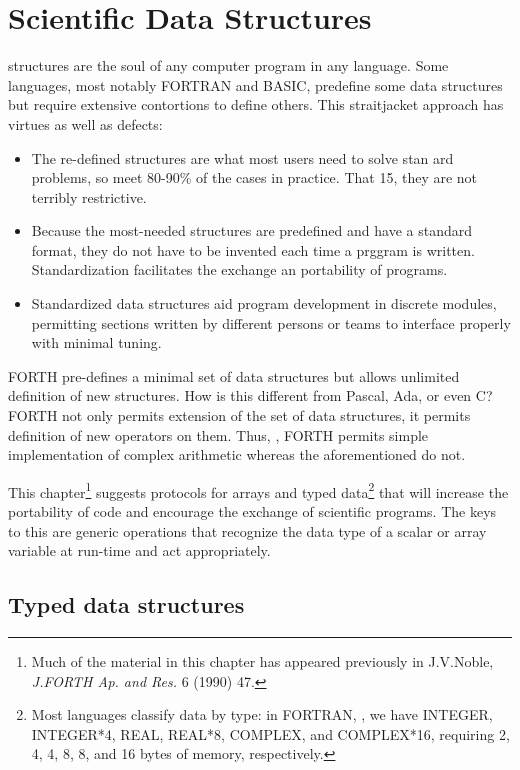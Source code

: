 \chapter{Scientific Data Structures}
\startcontents[chapters]

 structures are the soul of any computer program in any language. Some languages, most notably FORTRAN and BASIC, predefine some data structures but require extensive contortions to define others. This straitjacket approach has virtues as well as defects:

\begin{itemize}
    \item The re-defined structures are what most users need to solve stan ard problems, so meet 80-90\% of the cases in practice. That 15, they are not terribly restrictive.
    \item Because the most-needed structures are predefined and have a standard format, they do not have to be invented each time a prggram is written. Standardization facilitates the exchange an portability of programs.
    \item Standardized data structures aid program development in discrete modules, permitting sections written by different persons or teams to interface properly with minimal tuning.
\end{itemize}

FORTH pre-defines a minimal set of data structures but allows unlimited definition of new structures. How is this different from Pascal, Ada, or even C? FORTH not only permits extension of the set of data structures, it permits definition of new operators on them. Thus, \eg, FORTH permits simple implementation of complex arithmetic whereas the aforementioned do not.

This chapter\footnote{Much of the material in this chapter has appeared previously in J.V.Noble, \textit{J.FORTH Ap. and Res.} 6 (1990) 47.} suggests protocols for arrays and typed data\footnote{Most languages classify data by type: in FORTRAN, \eg, we have INTEGER, INTEGER*4, REAL, REAL*8, COMPLEX, and COMPLEX*16, requiring 2, 4, 4, 8, 8, and 16 bytes of memory, respectively.} that will increase the portability of code and encourage the exchange of scientific programs. The keys to this are generic operations that recognize the data type of a scalar or array variable at run-time and act appropriately.

\section{Typed data structures}

